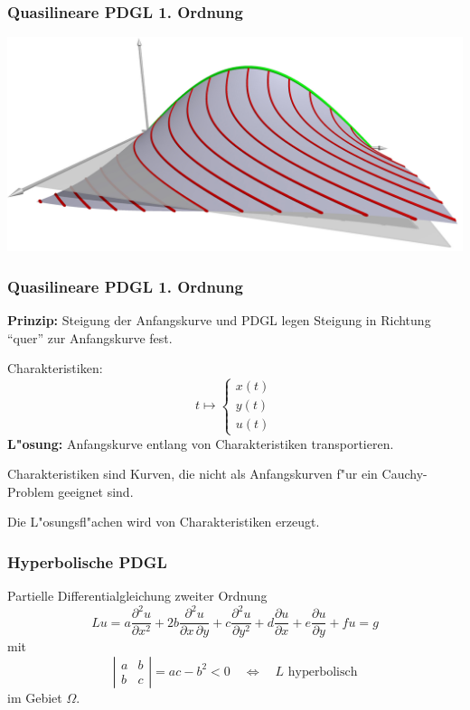 \documentclass[handout]{beamer}
\begin{document}
\begin{frame}
\frametitle{Quasilineare PDGL 1. Ordnung}
\begin{center}
\includegraphics[width=\hsize]{../../skript/3d/sol.jpg}
\end{center}
\end{frame}

\begin{frame}
\frametitle{Quasilineare PDGL 1. Ordnung}

{\bf Prinzip:} Steigung der Anfangskurve und PDGL legen Steigung in Richtung
``quer'' zur Anfangskurve fest.
\pause
\bigskip

Charakteristiken:
\[
t\mapsto \left\{\begin{aligned}
x(t)\\
y(t)\\
u(t)
\end{aligned}\right.
\]
{\bf L"osung:} Anfangskurve entlang von Charakteristiken transportieren.
\pause

\begin{definition}
Charakteristiken sind Kurven, die {\color{red}nicht} als Anfangskurven f"ur ein
Cauchy-Problem geeignet sind.
\end{definition}

\begin{theorem}
Die L"osungsfl"achen wird von Charakteristiken erzeugt.
\end{theorem}

\end{frame}

\begin{frame}
\frametitle{Hyperbolische PDGL}
Partielle Differentialgleichung zweiter Ordnung
\[
Lu
=
a\frac{\partial^2 u}{\partial x^2}
+
2b \frac{\partial^2 u}{\partial x\,\partial y}
+
c\frac{\partial^2 u}{\partial y^2}
+
d\frac{\partial u}{\partial x}
+
e\frac{\partial u}{\partial y}
+
fu=g
\]
mit
\[
\left|\begin{matrix}
a&b\\b&c
\end{matrix}\right|
=ac-b^2 < 0
\quad\Leftrightarrow\quad
\text{$L$ hyperbolisch}
\]
im Gebiet $\Omega$.
\end{frame}
\end{document}
